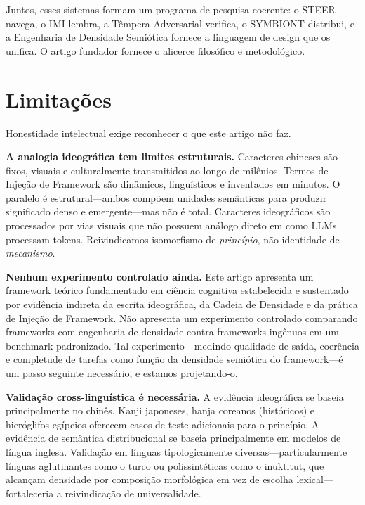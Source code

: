 \documentclass[12pt,a4paper]{article}
\begin{document}
Juntos, esses sistemas formam um programa de pesquisa coerente: o STEER navega, o IMI lembra, a Têmpera Adversarial verifica, o SYMBIONT distribui, e a Engenharia de Densidade Semiótica fornece a linguagem de design que os unifica.
O artigo fundador \cite{gomes2026founding} fornece o alicerce filosófico e metodológico.


\section{Limitações}
\label{sec:limitations}

Honestidade intelectual exige reconhecer o que este artigo não faz.

\textbf{A analogia ideográfica tem limites estruturais.}
Caracteres chineses são fixos, visuais e culturalmente transmitidos ao longo de milênios.
Termos de Injeção de Framework são dinâmicos, linguísticos e inventados em minutos.
O paralelo é estrutural---ambos compõem unidades semânticas para produzir significado denso e emergente---mas não é total.
Caracteres ideográficos são processados por vias visuais que não possuem análogo direto em como LLMs processam tokens.
Reivindicamos isomorfismo de \textit{princípio}, não identidade de \textit{mecanismo}.

\textbf{Nenhum experimento controlado ainda.}
Este artigo apresenta um framework teórico fundamentado em ciência cognitiva estabelecida e sustentado por evidência indireta da escrita ideográfica, da Cadeia de Densidade e da prática de Injeção de Framework.
Não apresenta um experimento controlado comparando frameworks com engenharia de densidade contra frameworks ingênuos em um benchmark padronizado.
Tal experimento---medindo qualidade de saída, coerência e completude de tarefas como função da densidade semiótica do framework---é um passo seguinte necessário, e estamos projetando-o.

\textbf{Validação cross-linguística é necessária.}
A evidência ideográfica se baseia principalmente no chinês.
Kanji japoneses, hanja coreanos (históricos) e hieróglifos egípcios oferecem casos de teste adicionais para o princípio.
A evidência de semântica distribucional se baseia principalmente em modelos de língua inglesa.
Validação em línguas tipologicamente diversas---particularmente línguas aglutinantes como o turco ou polissintéticas como o inuktitut, que alcançam densidade por composição morfológica em vez de escolha lexical---fortaleceria a reivindicação de universalidade.
\end{document}
